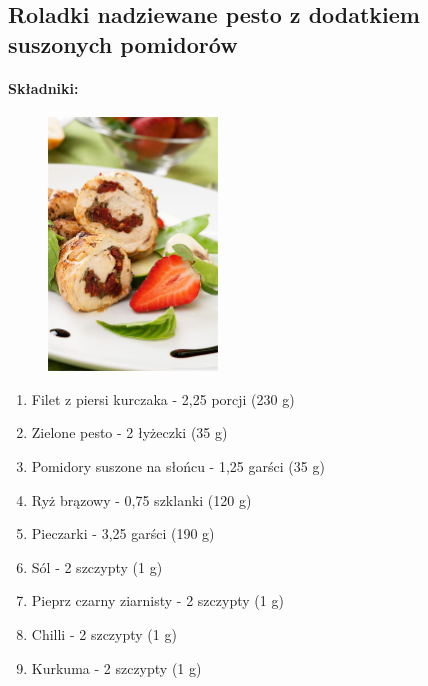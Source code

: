 \documentclass{article}
\begin{document}
    \subsection{Roladki nadziewane pesto z dodatkiem suszonych pomidorów}
    \bigskip
    \paragraph{Składniki:}
    \begin{figure}
        \includegraphics[width=0.4\textwidth, height=0.5\textwidth]{roladki-z-suszonymi-pomidorami-i-pesto.jpg}
    \end{figure}
    \begin{enumerate}
        \item Filet z piersi kurczaka - 2,25 porcji (230 g)
        \item Zielone pesto - 2 łyżeczki (35 g)
        \item Pomidory suszone na słońcu - 1,25 garści (35 g)
        \item Ryż brązowy - 0,75 szklanki (120 g)
        \item Pieczarki - 3,25 garści (190 g)
        \item Sól - 2 szczypty (1 g)
        \item Pieprz czarny ziarnisty - 2 szczypty (1 g)
        \item Chilli - 2 szczypty (1 g)
        \item Kurkuma - 2 szczypty (1 g)
    \end{enumerate}
\end{document}
